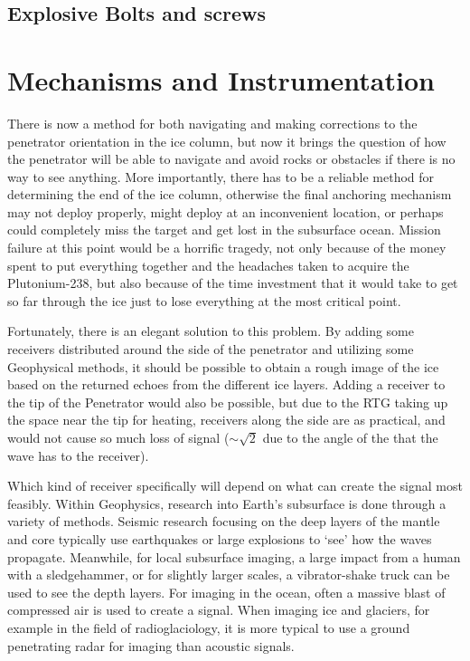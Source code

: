 

\subsection{Explosive Bolts and screws}



\section{Mechanisms and Instrumentation}



There is now a method for both navigating and making corrections to the penetrator orientation in the ice column, but now it brings the question of how the penetrator will be able to navigate and avoid rocks or obstacles if there is no way to see anything. More importantly, there has to be a reliable method for determining the end of the ice column, otherwise the final anchoring mechanism may not deploy properly, might deploy at an inconvenient location, or perhaps could completely miss the target and get lost in the subsurface ocean. Mission failure at this point would be a horrific tragedy, not only because of the money spent to put everything together and the headaches taken to acquire the Plutonium-238, but also because of the time investment that it would take to get so far through the ice just to lose everything at the most critical point.

Fortunately, there is an elegant solution to this problem. By adding some receivers distributed around the side of the penetrator and utilizing some Geophysical methods, it should be possible to obtain a rough image of the ice based on the returned echoes from the different ice layers. Adding a receiver to the tip of the Penetrator would also be possible, but due to the RTG taking up the space near the tip for heating, receivers along the side are as practical, and would not cause so much loss of signal ($\sim \sqrt{2}$ due to the angle of the that the wave has to the receiver).

Which kind of receiver specifically will depend on what can create the signal most feasibly. Within Geophysics, research into Earth's subsurface is done through a variety of methods. Seismic research focusing on the deep layers of the mantle and core typically use earthquakes or large explosions to `see' how the waves propagate. Meanwhile, for local subsurface imaging, a large impact from a human with a sledgehammer, or for slightly larger scales, a vibrator-shake truck can be used to see the depth layers. For imaging in the ocean, often a massive blast of compressed air is used to create a signal. When imaging ice and glaciers, for example in the field of radioglaciology, it is more typical to use a ground penetrating radar for imaging than acoustic signals. 

